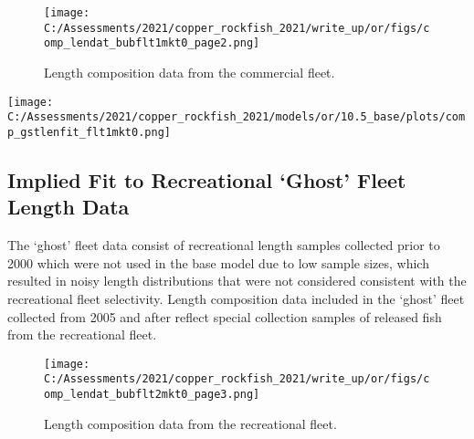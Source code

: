 \documentclass[11pt,
  english,
  a4paper,
]{article}
\begin{document}

\begin{figure}
\centering
\texttt{[image: C:/Assessments/2021/copper\_rockfish\_2021/write\_up/or/figs/comp\_lendat\_bubflt1mkt0\_page2.png]}
\caption{Length composition data from the commercial fleet.\label{fig:ghost-com-len-data}}
\end{figure}

\tagmcend\tagstructend


\texttt{[image: C:/Assessments/2021/copper\_rockfish\_2021/models/or/10.5\_base/plots/comp\_gstlenfit\_flt1mkt0.png]} \clearpage

\tagmcend\tagstructend


\hypertarget{append-rec}{%
\subsection{Implied Fit to Recreational `Ghost' Fleet Length Data}\label{append-rec}}

\leavevmode\tagmcend\tagstructend


The `ghost' fleet data consist of recreational length samples collected prior to 2000 which were not used in the base model due to low sample sizes, which resulted in noisy length distributions that were not considered consistent with the recreational fleet selectivity. Length composition data included in the `ghost' fleet collected from 2005 and after reflect special collection samples of released fish from the recreational fleet.

\leavevmode\tagmcend\tagstructend\par


\begin{figure}
\centering
\texttt{[image: C:/Assessments/2021/copper\_rockfish\_2021/write\_up/or/figs/comp\_lendat\_bubflt2mkt0\_page3.png]}
\caption{Length composition data from the recreational fleet.\label{fig:ghost-rec-len-data}}
\end{figure}

\tagmcend\tagstructend
\end{document}
